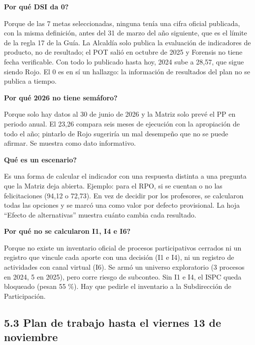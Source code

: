 \documentclass[11pt,letterpaper]{article}
\begin{document}

\textbf{\textquestiondown{}Por qué DSI da 0?}

Porque de las 7 metas seleccionadas, ninguna tenía una cifra oficial publicada, con la misma definición, antes del 31 de marzo del año siguiente, que es el límite de la regla 17 de la Guía. La Alcaldía solo publica la evaluación de indicadores de producto, no de resultado; el POT salió en octubre de 2025 y Forensis no tiene fecha verificable. Con todo lo publicado hasta hoy, 2024 sube a 28,57, que sigue siendo Rojo. El 0 es en sí un hallazgo: la información de resultados del plan no se publica a tiempo.


\textbf{\textquestiondown{}Por qué 2026 no tiene semáforo?}

Porque solo hay datos al 30 de junio de 2026 y la Matriz solo prevé el PP en periodo anual. El 23,26 compara seis meses de ejecución con la apropiación de todo el año; pintarlo de Rojo sugeriría un mal desempeño que no se puede afirmar. Se muestra como dato informativo.


\textbf{\textquestiondown{}Qué es un escenario?}

Es una forma de calcular el indicador con una respuesta distinta a una pregunta que la Matriz deja abierta. Ejemplo: para el RPO, si se cuentan o no las felicitaciones (94,12 o 72,73). En vez de decidir por los profesores, se calcularon todas las opciones y se marcó una como valor por defecto provisional. La hoja ``Efecto de alternativas'' muestra cuánto cambia cada resultado.


\textbf{\textquestiondown{}Por qué no se calcularon I1, I4 e I6?}

Porque no existe un inventario oficial de procesos participativos cerrados ni un registro que vincule cada aporte con una decisión (I1 e I4), ni un registro de actividades con canal virtual (I6). Se armó un universo exploratorio (3 procesos en 2024, 5 en 2025), pero corre riesgo de subconteo. Sin I1 e I4, el ISPC queda bloqueado (pesan 55 \%). Hay que pedirle el inventario a la Subdirección de Participación.

\subsection*{5.3 Plan de trabajo hasta el viernes 13 de noviembre}
\end{document}
